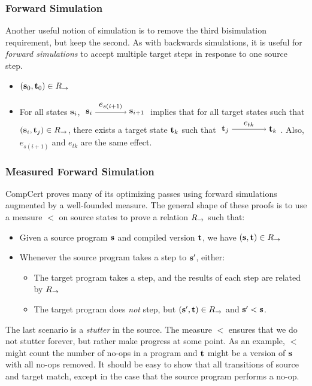 \subsubsection{Forward Simulation}
Another useful notion of simulation is to remove the third bisimulation requirement, but keep the second.
As with backwards simulations, it is useful for \emph{forward simulations} to accept multiple target steps in response to one source step.
\begin{itemize}
\item $(\mathbf{s}_0, \mathbf{t}_0) \in {R_\rightarrow}$
\item For all states $\mathbf{s}_i$, $\stepsto{\srcprog_i}{\srcprog_{i+1}}{e_{s(i+1)}}$
      implies that for all target states such that $(\mathbf{s}_i, \mathbf{t}_j) \in {R_\rightarrow}$,
      there exists a target state $\mathbf{t}_{k}$ such that $\stepsto{\tgtprog_j}{\tgtprog_{k}}{e_{tk}}$.
      Also, $e_{s(i+1)}$ and $e_{tk}$ are the same effect.
\end{itemize}


\subsubsection{Measured Forward Simulation}
CompCert proves many of its optimizing passes using forward simulations augmented by a well-founded measure.
The general shape of these proofs is to use a measure $<$ on source states to prove a relation ${R_\rightarrow}$ such that:
\begin{itemize}
\item Given a source program $\mathbf{s}$ and compiled version $\mathbf{t}$, we have $(\mathbf{s}, \mathbf{t}) \in {R_\rightarrow}$
\item Whenever the source program takes a step to $\mathbf{s}'$, either:
  \begin{itemize}
  \item The target program takes a step, and the results of each step are related by ${R_\rightarrow}$
  \item The target program does \emph{not} step, but $(\mathbf{s}', \mathbf{t}) \in {R_\rightarrow}$ and $\mathbf{s}' < \mathbf{s}$.
  \end{itemize}
\end{itemize}
The last scenario is a \emph{stutter} in the source.
The measure $<$ ensures that we do not stutter forever, but rather make progress at some point.
As an example, $<$ might count the number of no-ops in a program and $\mathbf{t}$ might be a version of $\mathbf{s}$ with all no-ops removed.
It should be easy to show that all transitions of source and target match, except in the case that the source program performs a no-op.


